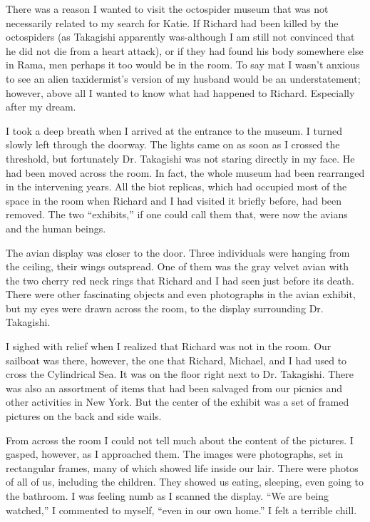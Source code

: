\documentclass[]{article}
\begin{document}
There was a reason I wanted to visit the octospider museum that was not necessarily related to my search for Katie. If Richard had been killed by the octospiders (as Takagishi apparently was-although I am still not convinced that he did not die from a heart attack), or if they had found his body somewhere else in Rama, men perhaps it too would be in the room. To say mat I wasn’t anxious to see an alien taxidermist’s version of my husband would be an understatement; however, above all I wanted to know what had happened to Richard. Especially after my dream.

I took a deep breath when I arrived at the entrance to the museum. I turned slowly left through the doorway. The lights came on as soon as I crossed the threshold, but fortunately Dr. Takagishi was not staring directly in my face. He had been moved across the room. In fact, the whole museum had been rearranged in the intervening years. All the biot replicas, which had occupied most of the space in the room when Richard and I had visited it briefly before, had been removed. The two “exhibits,” if one could call them that, were now the avians and the human beings.

The avian display was closer to the door. Three individuals were hanging from the ceiling, their wings outspread. One of them was the gray velvet avian with the two cherry red neck rings that Richard and I had seen just before its death. There were other fascinating objects and even photographs in the avian exhibit, but my eyes were drawn across the room, to the display surrounding Dr. Takagishi.

I sighed with relief when I realized that Richard was not in the room. Our sailboat was there, however, the one that Richard, Michael, and I had used to cross the Cylindrical Sea. It was on the floor right next to Dr. Takagishi. There was also an assortment of items that had been salvaged from our picnics and other activities in New York. But the center of the exhibit was a set of framed pictures on the back and side wails.

From across the room I could not tell much about the content of the pictures. I gasped, however, as I approached them. The images were photographs, set in rectangular frames, many of which showed life inside our lair. There were photos of all of us, including the children. They showed us eating, sleeping, even going to the bathroom. I was feeling numb as I scanned the display. “We are being watched,” I commented to myself, “even in our own home.” I felt a terrible chill.
\end{document}
